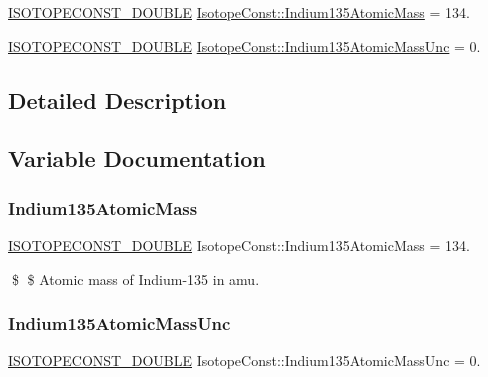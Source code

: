 \begin{DoxyCompactItemize}
\item 
\mbox{\hyperlink{group___isotope_const-_macros_ga8f45a7272ce02c0b4c65c44636ed719a}{I\+S\+O\+T\+O\+P\+E\+C\+O\+N\+S\+T\+\_\+\+D\+O\+U\+B\+LE}} \mbox{\hyperlink{group___isotope_const-_indium-_in135_ga2a2ad9151aa3a14d5965a2032d084815}{Isotope\+Const\+::\+Indium135\+Atomic\+Mass}} = 134.
\item 
\mbox{\hyperlink{group___isotope_const-_macros_ga8f45a7272ce02c0b4c65c44636ed719a}{I\+S\+O\+T\+O\+P\+E\+C\+O\+N\+S\+T\+\_\+\+D\+O\+U\+B\+LE}} \mbox{\hyperlink{group___isotope_const-_indium-_in135_ga50219fd68895b8d19e451beb101a1bac}{Isotope\+Const\+::\+Indium135\+Atomic\+Mass\+Unc}} = 0.
\end{DoxyCompactItemize}


\subsection{Detailed Description}


\subsection{Variable Documentation}
\mbox{\label{group___isotope_const-_indium-_in135_ga2a2ad9151aa3a14d5965a2032d084815}} 
\subsubsection{\texorpdfstring{Indium135\+Atomic\+Mass}{Indium135AtomicMass}}
{\footnotesize\ttfamily \mbox{\hyperlink{group___isotope_const-_macros_ga8f45a7272ce02c0b4c65c44636ed719a}{I\+S\+O\+T\+O\+P\+E\+C\+O\+N\+S\+T\+\_\+\+D\+O\+U\+B\+LE}} Isotope\+Const\+::\+Indium135\+Atomic\+Mass = 134.}

\$ \$ Atomic mass of Indium-\/135 in amu. \mbox{\label{group___isotope_const-_indium-_in135_ga50219fd68895b8d19e451beb101a1bac}} 
\subsubsection{\texorpdfstring{Indium135\+Atomic\+Mass\+Unc}{Indium135AtomicMassUnc}}
{\footnotesize\ttfamily \mbox{\hyperlink{group___isotope_const-_macros_ga8f45a7272ce02c0b4c65c44636ed719a}{I\+S\+O\+T\+O\+P\+E\+C\+O\+N\+S\+T\+\_\+\+D\+O\+U\+B\+LE}} Isotope\+Const\+::\+Indium135\+Atomic\+Mass\+Unc = 0.}

